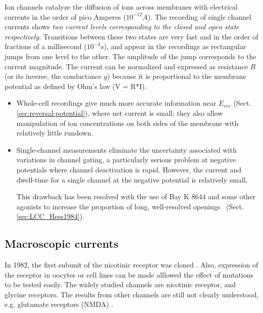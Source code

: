 Ion channels catalyze the diffusion of ions across membranes with
electrical currents in the order of pico Amperes ($10^{-12}A$). The
recording of single channel currents shows
{\it two current levels corresponding to the closed and open state
  respectively}.
Transitions between these two states are very fast and in the order of
fractions of a millisecond ($10^{-3}s$), and appear in the recordings
as rectangular jumps from one level to the other. The amplitude of the
jump corresponds to the current magnitude. The current can be
normalized and expressed as resistance $R$ (or its inverse, the
conductance $g$) because it is proportional to the membrane potential as
defined by Ohm's law (V = R*I).


\begin{itemize}
\item Whole-cell recordings give much more accurate information near
  $E_{rev}$ (Sect.\ref{sec:reversal-potential}), where net current is small; they
  also allow manipulation of ion concentrations on both sides of the membrane with relatively
  little rundown.

\item Single-channel measurements eliminate the uncertainty associated
  with variations in channel gating, a particularly serious problem at negative
  potentials where channel deactivation is rapid.  However, the current and
  dwell-time for a single channel at the negative potential is relatively small.

  This drawback has been resolved with the use of Bay K 8644 and some other
  agonists to increase the proportion of long, well-resolved
  openings~\citep{hess1986ccs} (Sect.\ref{sec:LCC_Hess1984}).
\end{itemize}


\subsection{Macroscopic currents}

In 1982, the first subunit of the nicotinic receptor was cloned
\citep{noda1982}. Also, expression of the receptor in oocytes or cell lines can
be made alllowed the effect of mutations to be tested easily. The widely studied
channels are nicotinic receptor, and glycine receptors. The results from other
channels are still not clearly understood, e.g. glutamate receptors (NMDA)
\citep{colquhoun2002}.

